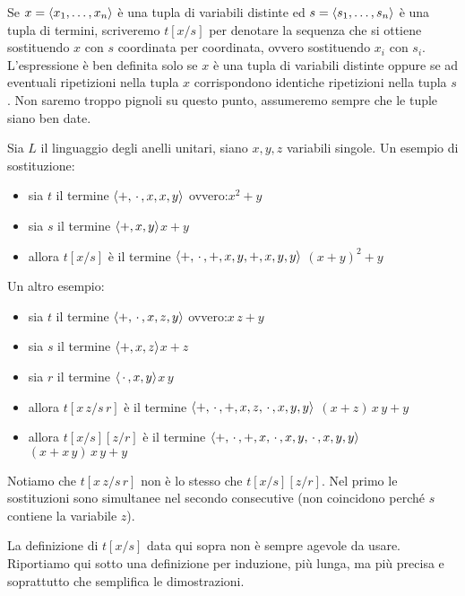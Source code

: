 Se $x=\langle x_1,\dots,x_n\rangle$ \`e una tupla di variabili distinte ed $s=\langle s_1,\dots,s_n\rangle$ \`e una tupla di termini, scriveremo \emph{$t[x/s]$\/} per denotare la sequenza che si ottiene sostituendo $x$ con $s$ coordinata per coordinata, ovvero sostituendo $x_i$ con $s_i$. L'espressione \`e ben definita solo se $x$ \`e una tupla di variabili distinte oppure se ad eventuali ripetizioni nella tupla $x$ corrispondono identiche ripetizioni nella tupla $s$. Non saremo troppo pignoli su questo punto, assumeremo sempre che le tuple siano ben date.

\begin{example} Sia $L$ il linguaggio degli anelli unitari, siano $x,y,z$ variabili singole. Un esempio di sostituzione:
\begin{itemize}
\item sia $t$ il termine $\langle\mathord+,\,\cdot\,, x,x,y\rangle$ \hfill\hfill ovvero:\hfill $x^2 +y$
\item sia $s$ il termine $\langle\mathord+,x,y\rangle$\hfill $x+y$
\item allora $t[x/s]$ \`e il termine $\langle\mathord+,\,\cdot\,,\mathord+,x,y,\mathord+,x,y,y\rangle$  \hfill $(x+y)^2+y$
\end{itemize}
Un altro esempio:
\begin{itemize}
\item sia $t$  il termine $\langle\mathord+,\,\cdot\,, x,z,y\rangle$ \hfill\hfill ovvero:\hfill $x\,z+y$
\item sia $s$  il termine $\langle\mathord+,x,z\rangle$\hfill $x+z$
\item sia $r$  il termine $\langle\,\cdot\,, x,y\rangle$\hfill $x\,y$
\item allora $t[x\,z/s\,r]$ \`e il termine  $\langle\mathord+,\,\cdot\,,\mathord+,x,z,\,\cdot\,, x,y,y\rangle$  \hfill $(x+z)\,x\,y+y$
\item allora $t[x/s][z/r]$ \`e il termine  $\langle\mathord+,\,\cdot\,,\mathord+,x,\,\cdot\,, x,y,\,\cdot\,, x,y,y\rangle$  \hfill $(x+x\,y)\,x\,y+y$
\end{itemize}
Notiamo che $t[x\,z/s\,r]$ non \`e lo stesso che $t[x/s][z/r]$. Nel primo le sostituzioni sono simultanee nel secondo consecutive  (non coincidono perch\'e $s$ contiene la variabile $z$).
\end{example}

La definizione di $t[x/s]$ data qui sopra non \`e sempre agevole da usare. Riportiamo qui sotto una definizione per induzione, pi\`u lunga, ma pi\`u precisa e soprattutto che semplifica le dimostrazioni.

